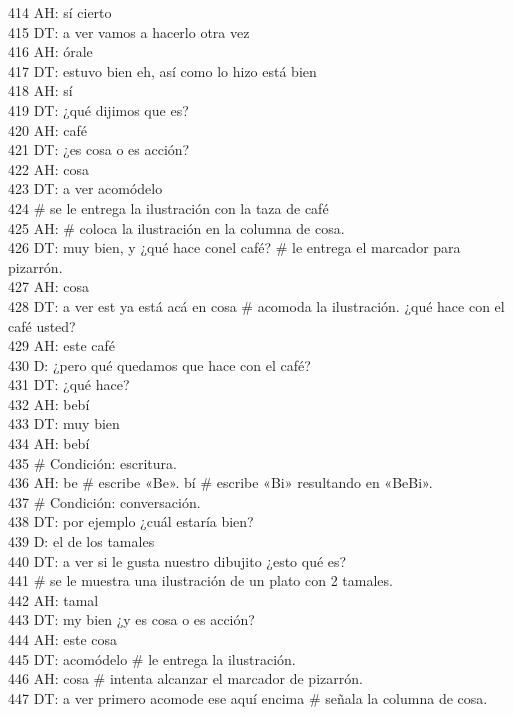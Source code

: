 414 AH: sí cierto\\
415 DT: a ver vamos a hacerlo otra vez\\
416 AH: órale\\
417 DT: estuvo bien eh, así como lo hizo está bien\\
418 AH: sí\\
419 DT: ¿qué dijimos que es?\\
420 AH: café\\
421 DT: ¿es cosa o es acción?\\
422 AH: cosa\\
423 DT: a ver acomódelo\\
424 \# se le entrega la ilustración con la taza de café\\
425 AH: \# coloca la ilustración en la columna de cosa.\\
426 DT: muy bien, y ¿qué hace conel café? \# le entrega el marcador para pizarrón.\\
427 AH: cosa\\
428 DT: a ver est ya está acá en cosa \# acomoda la ilustración. ¿qué hace con el café usted?\\
429 AH: este café\\
430 D: ¿pero qué quedamos que hace con el café?\\
431 DT: ¿qué hace?\\
432 AH: bebí\\
433 DT: muy bien\\
434 AH: bebí\\
435 \# Condición: escritura.\\
436 AH: be \# escribe «Be». bí \# escribe «Bi» resultando en «BeBi».\\
437 \# Condición: conversación.\\
438 DT: por ejemplo ¿cuál estaría bien?\\
439 D: el de los tamales\\
440 DT: a ver si le gusta nuestro dibujito ¿esto qué es?\\
441 \# se le muestra una ilustración de un plato con 2 tamales.\\
442 AH: tamal\\
443 DT: my bien ¿y es cosa o es acción?\\
444 AH: este cosa\\
445 DT: acomódelo \# le entrega la ilustración.\\
446 AH: cosa \# intenta alcanzar el marcador de pizarrón.\\
447 DT: a ver primero acomode ese aquí encima \# señala la columna de cosa.\\
